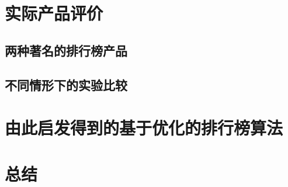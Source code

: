 \documentclass[UTF8]{ctexart}
\theoremstyle{plain}
\theoremstyle{definition}
\theoremstyle{remark}
\begin{document}
	\section{实际产品评价}
	\subsection{两种著名的排行榜产品}
	\subsection{不同情形下的实验比较}
	\section{由此启发得到的基于优化的排行榜算法}
	\section{总结}
	
\end{document}
